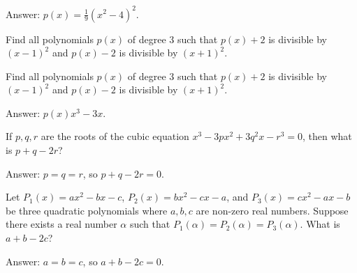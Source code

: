 \documentclass[12pt,a4paper]{memoir}
\theoremstyle{definition}
\begin{document}
\begin{solution}[name=Solution by Parviz Shahriari]
	Answer: $\displaystyle p(x)=\frac{1}{9}(x^2-4)^2$.
\end{solution}


\begin{tcolorbox}
	\begin{question}
		Find all polynomials $p(x)$ of degree $3$ such that $p(x)+2$ is divisible by $(x-1)^2$ and $p(x)-2$ is divisible by $(x+1)^2$.
	\end{question}
\end{tcolorbox}



\begin{tcolorbox}
	\begin{question}
		Find all polynomials $p(x)$ of degree $3$ such that $p(x)+2$ is divisible by $(x-1)^2$ and $p(x)-2$ is divisible by $(x+1)^2$.
	\end{question}
\end{tcolorbox}


\begin{solution}[name=Solution by Parviz Shahriari]
	Answer: $\displaystyle p(x)x^3-3x$.
\end{solution}


\begin{tcolorbox}
	\begin{question}
		If $p,q,r$ are the roots of the cubic equation $x^3-3px^2+3q^2x-r^3=0$, then what is $p+q-2r$?
	\end{question}
\end{tcolorbox}


\begin{solution}[name=Solution by Problem Premier for the Olympiad]
	Answer: $p=q=r$, so $p+q-2r=0$.
\end{solution}


\begin{tcolorbox}
	\begin{question}
		Let $P_1(x)=ax^2-bx-c$, $P_2(x)=bx^2-cx-a$, and $P_3(x)=cx^2-ax-b$ be three quadratic polynomials where $a,b,c$ are non-zero real numbers. Suppose there exists a real number $\alpha$ such that $P_1(\alpha)=P_2(\alpha)=P_3(\alpha)$. What is $a+b-2c$?
	\end{question}
\end{tcolorbox}


\begin{solution}[name=Solution by Regional Math Olympiad 2010]
	Answer: $a=b=c$, so $a+b-2c=0$.
\end{solution}
\end{document}
